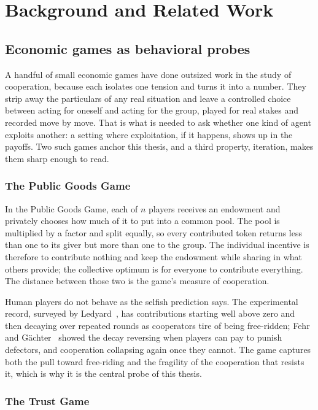 \chapter{Background and Related Work}
\label{ch:background}

\section{Economic games as behavioral probes}
\label{sec:bg-games}

A handful of small economic games have done outsized work in the study of cooperation,
because each isolates one tension and turns it into a number. They strip away the
particulars of any real situation and leave a controlled choice between acting for
oneself and acting for the group, played for real stakes and recorded move by move. That
is what is needed to ask whether one kind of agent exploits another: a setting where
exploitation, if it happens, shows up in the payoffs. Two such games anchor this thesis,
and a third property, iteration, makes them sharp enough to read.

\subsection{The Public Goods Game}
\label{subsec:bg-pgg}

In the Public Goods Game, each of $n$ players receives an endowment and privately chooses
how much of it to put into a common pool. The pool is multiplied by a factor and split
equally, so every contributed token returns less than one to its giver but more than one
to the group. The individual incentive is therefore to contribute nothing and keep the
endowment while sharing in what others provide; the collective optimum is for everyone to
contribute everything. The distance between those two is the game's measure of
cooperation.

Human players do not behave as the selfish prediction says. The experimental record,
surveyed by Ledyard~\cite{ledyard1995}, has contributions starting well above zero
and then decaying over repeated rounds as cooperators tire of being free-ridden; Fehr and
G\"achter~\cite{fehrgachter2000} showed the decay reversing when players can pay to punish
defectors, and cooperation collapsing again once they cannot. The game captures both the
pull toward free-riding and the fragility of the cooperation that resists it, which is why
it is the central probe of this thesis.

\subsection{The Trust Game}
\label{subsec:bg-trust}

